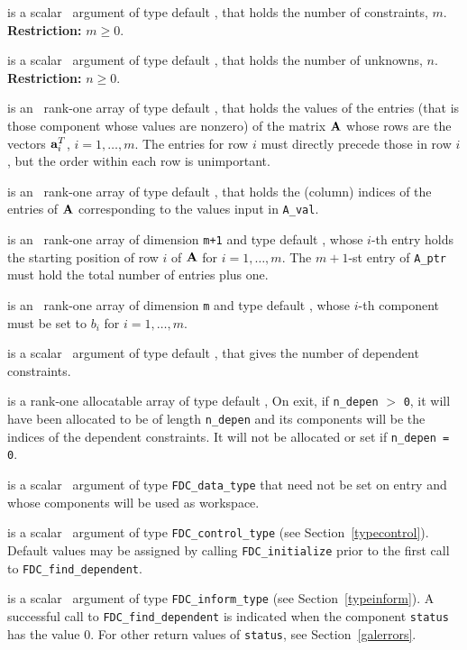\documentclass{galahad}
\newcommand{\packagename}{FDC}
\begin{document}
\begin{description}

 is a scalar \intentin\ argument of type default \integer,
that holds the number of constraints, $m$.
{\bf Restriction: } $m \geq 0$.

 is a scalar \intentin\ argument of type default \integer,
that holds the number of unknowns, $n$.
{\bf Restriction: } $n \geq 0$.

 is an \intentin\ rank-one array of type default \realdp, that holds
the values of the entries (that is those component whose values are nonzero)
of the matrix ${\mathbf{A}}$ whose rows are the vectors ${\mathbf{a}}_i^T$, $i = 1, \ldots, m$.
The entries for row $i$ must directly precede those in row $i$, but the
order within each row is unimportant.

 is an \intentin\ rank-one array of type default \integer, that
holds the (column) indices of the entries of ${\mathbf{A}}$ corresponding to the
values input in {\tt A\_val}.

 is an \intentin\ rank-one array of dimension {\tt m+1} and type
default \integer, whose $i$-th entry holds the starting position of row $i$
of ${\mathbf{A}}$ for $i = 1, \ldots, m$. The $m+1$-st entry of {\tt A\_ptr}
must hold the total number of entries plus one.

 is an \intentin\ rank-one array of dimension {\tt m} and
type default \realdp, whose $i$-th component must be set to $b_i$ for
$i = 1, \ldots, m$.

 is a scalar \intentout\ argument of type default \integer,
that gives the number of dependent constraints.

 is a rank-one allocatable array of type default \integer,
On exit, if {\tt n\_depen} $>$ {\tt 0}, it will have been allocated to be of
length {\tt n\_depen} and its components will be the indices of the dependent
constraints. It will not be allocated or set if {\tt n\_depen = 0}.

 is a scalar \intentinout\ argument of type
{\tt \packagename\_data\_type}
that need not be set on entry and whose components will be used as workspace.

 is a scalar \intentin\ argument of type
{\tt \packagename\_control\_type}
(see Section~\ref{typecontrol}). Default values may be assigned by calling
{\tt \packagename\_initialize} prior to the first call to
{\tt \packagename\_find\_dependent}.

 is a scalar \intentinout\ argument of type
{\tt \packagename\_inform\_type}
(see Section~\ref{typeinform}). A successful call to
{\tt \packagename\_find\_dependent}
is indicated when the  component {\tt status} has the value 0.
For other return values of {\tt status}, see Section~\ref{galerrors}.

\end{description}
\end{document}
